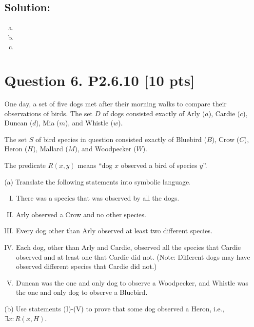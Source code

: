 \documentclass[12pt]{article}
\begin{document}
\subsection*{\textbf{Solution:}}
\begin{enumerate}[(a)]
\item 
\item 
\item 
\end{enumerate}



\newpage
\section*{\textbf{Question 6. P2.6.10} [10 pts]}
 One day, a set of five dogs met after their morning walks to compare their observations of birds. 
 The set $D$ of dogs consisted exactly of Arly ($a$), Cardie ($c$), Duncan ($d$), Mia ($m$), and Whistle ($w$). 
 
 The set $S$ of bird species in question consisted exactly of Bluebird ($B$), Crow ($C$), Heron ($H$), Mallard ($M$), and Woodpecker ($W$). 
 
 The predicate $R(x, y)$ means “dog $x$ observed a bird of species $y$”. 
 
 (a) Translate the following statements into symbolic language. 
\begin{enumerate}[I.]

    \item  There was a species that was observed by all the dogs.
    
    \item  Arly observed a Crow and no other species.
    
    \item  Every dog other than Arly observed at least two different species.
    
    \item  Each dog, other than Arly and Cardie, observed all the species that Cardie observed and at least one that Cardie did not. (Note: Different dogs may have observed different species that Cardie did not.)
    
    \item  Duncan was the one and only dog to observe a Woodpecker, and Whistle was the one and only dog to observe a Bluebird.
    
\end{enumerate}
 (b) Use statements (I)-(V)  to prove that some dog observed a Heron, i.e., 
 $\exists x: R(x,H).$
\end{document}
